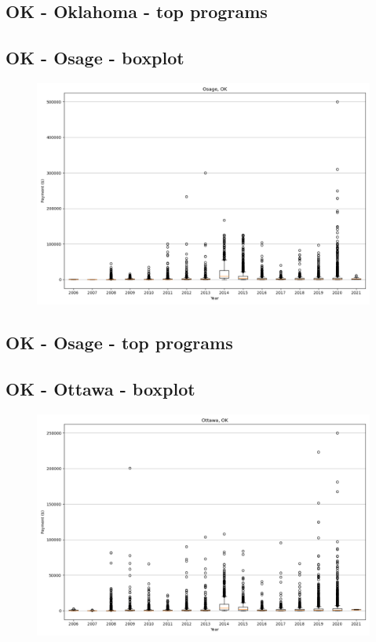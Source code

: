 \subsection*{OK - Oklahoma - top programs}

\newpage
\subsection*{OK - Osage - boxplot}
\begin{figure}[h]
\centering
\includegraphics[width=7in]{../output/boxplots/counties/Osage-OK_boxplot.png}
\end{figure}


\subsection*{OK - Osage - top programs}

\newpage
\subsection*{OK - Ottawa - boxplot}
\begin{figure}[h]
\centering
\includegraphics[width=7in]{../output/boxplots/counties/Ottawa-OK_boxplot.png}
\end{figure}


